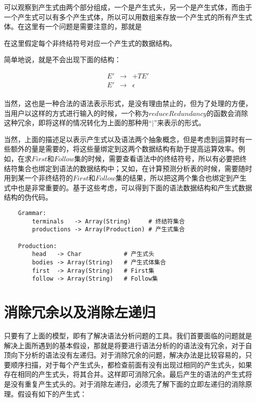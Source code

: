 可以观察到产生式由两个部分组成，一个是产生式头，另一个是产生式体，而由于一个产生式可以有多个产生式体，所以可以用数组来存放一个产生式的所有产生式体。在这里有一个问题是需要注意的，那就是\begin{bfseries}在这里假定每个非终结符号对应一个产生式的数据结构。\end{bfseries}简单地说，就是不会出现下面的结构：

\begin{eqnarray*}
    E' & \rightarrow & +TE' \\
    E' & \rightarrow & \epsilon \\
\end{eqnarray*}

当然，这也是一种合法的语法表示形式，是没有理由禁止的，但为了处理的方便，当用户以这样的方式进行输入的时候，一个称为$reduceRedundancy$的函数会消除这种冗余，即将这样的情况转化为上面的那种用``$|$''来表示的形式。

当然，上面的描述足以表示产生式以及语法两个抽象概念，但是考虑到运算时有一些额外的量是需要的，将这些量绑定到这两个数据结构有助于提高运算效率。例如，在求$First$和$Follow$集的时候，需要查看语法中的终结符号，所以有必要把终结符集合也绑定到语法的数据结构中；又如，在计算预测分析表的时候，需要随时用到某一个非终结符的$First$和$Follow$集的结果，所以把这两个集合也绑定到产生式中也是非常重要的。基于这些考虑，可以得到下面的语法数据结构和产生式数据结构的伪代码。

\begin{verbatim}
    Grammar:
        terminals   -> Array(String)     # 终结符集合
        productions -> Array(Production) # 产生式集合

    Production:
        head   -> Char            # 产生式头
        bodies -> Array(String)   # 产生式体集合
        first  -> Array(String)   # First集
        follow -> Array(String)   # Follow集
\end{verbatim}

\section{消除冗余以及消除左递归}

只要有了上面的模型，即有了解决语法分析问题的工具。我们首要面临的问题就是解决上面所遇到的基本假设，那就是将要进行语法分析的的语法没有冗余，对于自顶向下分析的语法没有左递归。对于消除冗余的问题，解决办法是比较容易的，只要顺序扫描，对于每个产生式头，都检查前面有没有出现过相同的产生式头，如果存在相同的产生式头，将其合并。这样即可消除冗余。最后产生的语法的产生式将是没有重复产生式头的。对于消除左递归，必须先了解下面的立即左递归的消除原理。假设有如下的产生式：

